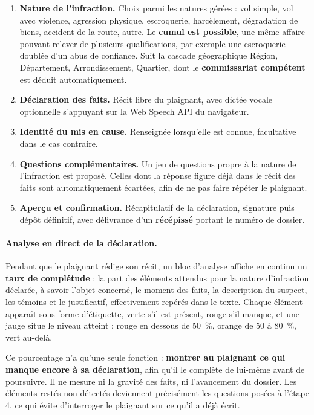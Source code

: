 \begin{enumerate}
    \item \textbf{Nature de l'infraction.} Choix parmi les natures gérées : vol simple, vol avec violence, agression physique, escroquerie, harcèlement, dégradation de biens, accident de la route, autre. Le \textbf{cumul est possible}, une même affaire pouvant relever de plusieurs qualifications, par exemple une escroquerie doublée d'un abus de confiance. Suit la cascade géographique Région, Département, Arrondissement, Quartier, dont le \textbf{commissariat compétent} est déduit automatiquement.
    \item \textbf{Déclaration des faits.} Récit libre du plaignant, avec dictée vocale optionnelle s'appuyant sur la Web Speech API du navigateur.
    \item \textbf{Identité du mis en cause.} Renseignée lorsqu'elle est connue, facultative dans le cas contraire.
    \item \textbf{Questions complémentaires.} Un jeu de questions propre à la nature de l'infraction est proposé. Celles dont la réponse figure déjà dans le récit des faits sont automatiquement écartées, afin de ne pas faire répéter le plaignant.
    \item \textbf{Aperçu et confirmation.} Récapitulatif de la déclaration, signature puis dépôt définitif, avec délivrance d'un \textbf{récépissé} portant le numéro de dossier.
\end{enumerate}

\paragraph{Analyse en direct de la déclaration.} Pendant que le plaignant rédige son récit, un bloc d'analyse affiche en continu un \textbf{taux de complétude} : la part des éléments attendus pour la nature d'infraction déclarée, à savoir l'objet concerné, le moment des faits, la description du suspect, les témoins et le justificatif, effectivement repérés dans le texte. Chaque élément apparaît sous forme d'étiquette, verte s'il est présent, rouge s'il manque, et une jauge situe le niveau atteint : rouge en dessous de 50~\%, orange de 50 à 80~\%, vert au-delà.

Ce pourcentage n'a qu'une seule fonction : \textbf{montrer au plaignant ce qui manque encore à sa déclaration}, afin qu'il le complète de lui-même avant de poursuivre. Il ne mesure ni la gravité des faits, ni l'avancement du dossier. Les éléments restés non détectés deviennent précisément les questions posées à l'étape 4, ce qui évite d'interroger le plaignant sur ce qu'il a déjà écrit.

